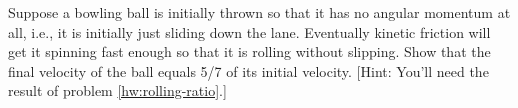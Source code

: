 Suppose a bowling ball is initially thrown so that it
has no angular momentum at all, i.e., it is initially just
sliding down the lane. Eventually kinetic friction will
get it spinning fast enough so that it is
rolling without slipping. Show that the final velocity of
the ball equals 5/7 of its initial velocity. [Hint: You'll
need the result of problem \ref{hw:rolling-ratio}.]
